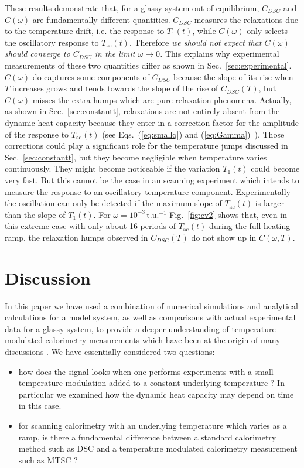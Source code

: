 \documentclass[pre,a4paper,twocolumn,superscriptaddress,%
floatfix]{revtex4}
\begin{document}
\bigskip
These results demonstrate that, for a glassy system out of equilibrium,
$C_{DSC}$ and $C(\omega)$ are fundamentally
different quantities. $C_{DSC}$ measures the relaxations due to the
temperature drift, i.e. the response to $T_1(t)$, while $C(\omega)$ only
selects the oscillatory response to $T_{\mathrm{ac}}(t)$. Therefore
{\em we should not expect that $C(\omega)$ should converge to $C_{DSC}$ in the
  limit $\omega \to 0$.} This explains why experimental measurements of these
two quantities differ as shown in Sec.~\ref{sec:experimental}.  $C(\omega)$ do
captures some components of $C_{DSC}$ because the slope of its rise when $T$
increases grows and tends towards the slope of the rise of $C_{DSC}(T)$, but
$C(\omega)$ misses the extra humps which are pure relaxation phenomena.
Actually, as shown in Sec.~\ref{sec:constantt}, relaxations are not entirely
absent from the dynamic heat capacity because they enter in a correction
factor for the amplitude of the response to $T_{\mathrm{ac}}(t)$
(see Eqs.~(\ref{eq:smallq}) and (\ref{eq:Gamma})~). Those corrections could
play a significant role for the temperature jumps discussed in
Sec.~\ref{sec:constantt}, but they become negligible when temperature varies
continuously. They might become noticeable if the variation $T_1(t)$ could
become very fast. But this cannot be the case in an scanning experiment which
intends to measure the response to an oscillatory temperature
component. Experimentally the oscillation can only be detected if the maximum
slope of $T_{\mathrm{ac}}(t)$ is larger than the slope of $T_1(t)$.
For $\omega = 10^{-3}\,$t.u.$^{-1}$ Fig.~\ref{fig:cv2} shows
that, even in this
extreme case with only about 16 periods of $T_{\mathrm{ac}}(t)$ during the
full heating ramp, the relaxation humps observed in $C_{DSC}(T)$ do not show
up in $C(\omega,T)$.
  

\section{Discussion}
\label{sec:discussion}

In this paper we have used a combination of numerical simulations and
analytical calculations for a model system, as well as comparisons with actual
experimental data for a glassy system, to provide a deeper understanding of
temperature modulated calorimetry measurements which have been at the origin
of many 
discussions \cite{GARDEN-REVIEW}. We have essentially considered two
questions:

\begin{itemize}
\item   how does the signal looks when one performs experiments with a 
small temperature modulation added to a constant underlying temperature ? In
particular we examined how the dynamic heat capacity may depend on time in
this case.

\item for scanning calorimetry with an underlying temperature
  which varies as a ramp, is there a fundamental difference between a
  standard calorimetry method such as DSC and a temperature modulated
  calorimetry  measurement such as MTSC ?

\end{itemize}
\end{document}
